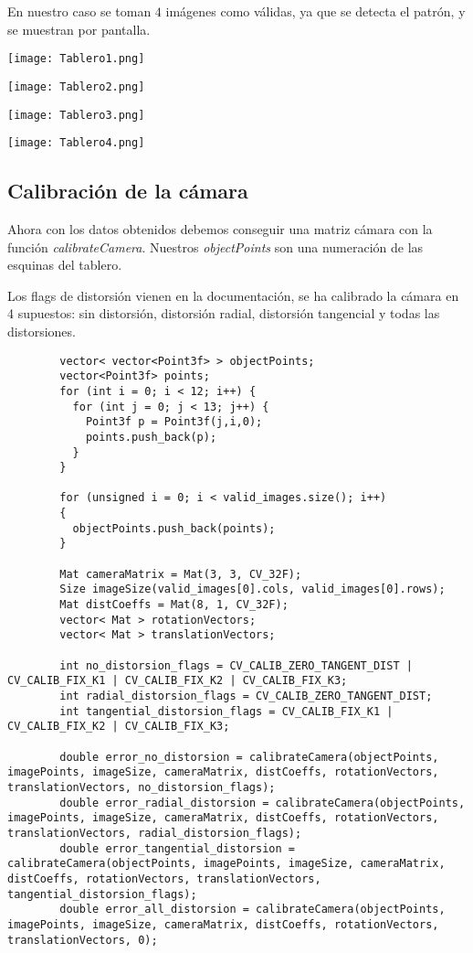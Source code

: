 \documentclass[a4paper, 11pt]{article}
\theoremstyle{definition}
\begin{document}
      En nuestro caso se toman $4$ imágenes como válidas, ya que se detecta el patrón, y se muestran
      por pantalla. \\

      \centerline{\texttt{[image: Tablero1.png]}}
      \centerline{\texttt{[image: Tablero2.png]}}
      \centerline{\texttt{[image: Tablero3.png]}}
      \centerline{\texttt{[image: Tablero4.png]}}

      \subsection{Calibración de la cámara}

      Ahora con los datos obtenidos debemos conseguir una matriz cámara con la función
      \emph{calibrateCamera}. Nuestros \emph{objectPoints} son una numeración de las esquinas del tablero.

      Los flags de distorsión vienen en la documentación, se ha calibrado la cámara
      en 4 supuestos: sin distorsión, distorsión radial, distorsión tangencial y
      todas las distorsiones.

      \begin{lstlisting}
        vector< vector<Point3f> > objectPoints;
        vector<Point3f> points;
        for (int i = 0; i < 12; i++) {
          for (int j = 0; j < 13; j++) {
            Point3f p = Point3f(j,i,0);
            points.push_back(p);
          }
        }

        for (unsigned i = 0; i < valid_images.size(); i++)
        {
          objectPoints.push_back(points);
        }

        Mat cameraMatrix = Mat(3, 3, CV_32F);
        Size imageSize(valid_images[0].cols, valid_images[0].rows);
        Mat distCoeffs = Mat(8, 1, CV_32F);
        vector< Mat > rotationVectors;
        vector< Mat > translationVectors;

        int no_distorsion_flags = CV_CALIB_ZERO_TANGENT_DIST | CV_CALIB_FIX_K1 | CV_CALIB_FIX_K2 | CV_CALIB_FIX_K3;
        int radial_distorsion_flags = CV_CALIB_ZERO_TANGENT_DIST;
        int tangential_distorsion_flags = CV_CALIB_FIX_K1 | CV_CALIB_FIX_K2 | CV_CALIB_FIX_K3;

        double error_no_distorsion = calibrateCamera(objectPoints, imagePoints, imageSize, cameraMatrix, distCoeffs, rotationVectors, translationVectors, no_distorsion_flags);
        double error_radial_distorsion = calibrateCamera(objectPoints, imagePoints, imageSize, cameraMatrix, distCoeffs, rotationVectors, translationVectors, radial_distorsion_flags);
        double error_tangential_distorsion = calibrateCamera(objectPoints, imagePoints, imageSize, cameraMatrix, distCoeffs, rotationVectors, translationVectors, tangential_distorsion_flags);
        double error_all_distorsion = calibrateCamera(objectPoints, imagePoints, imageSize, cameraMatrix, distCoeffs, rotationVectors, translationVectors, 0);

      \end{lstlisting}
\end{document}
